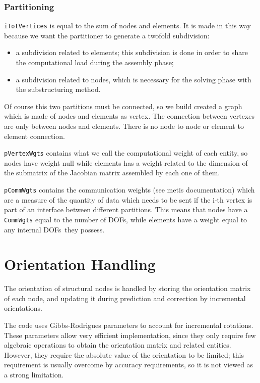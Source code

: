 \documentclass[10pt,fleqn,subeqn]{report}
\newcommand{\dofs}{DOFs}
\begin{document}
\subsection{Partitioning}
\texttt{iTotVertices} is equal to the sum of nodes and elements. 
It is made in this way because we want the partitioner 
to generate a twofold subdivision:
\begin{itemize}
\item a subdivision related to elements; 
this subdivision is done in order to share the computational 
load during the assembly phase;
\item a subdivision related to nodes, 
which is necessary for the solving phase with the substructuring method.
\end{itemize}
Of course this two partitions must be connected, 
so we build created a graph which is made of nodes and elements as vertex. 
The connection between vertexes are only between nodes and elements. 
There is no node to node or element to element connection.

\texttt{pVertexWgts} 
contains what we call the computational weight of each entity, 
so nodes have weight null while elements has a weight related to 
the dimension of the submatrix of the Jacobian matrix assembled
by each one of them.

\texttt{pCommWgts} contains the communication weights 
(see metis documentation) which are a measure of the quantity 
of data which needs to be sent if the i-th vertex is part 
of an interface between different partitions. 
This means that nodes have a \texttt{CommWgts} equal to the number 
of \dofs, while elements have a weight equal
to any internal \dofs\ they possess.


\chapter{Orientation Handling}
The orientation of structural nodes is handled by storing the orientation
matrix of each node, and updating it during prediction and correction 
by incremental orientations.

The code uses Gibbs-Rodrigues parameters to account for incremental 
rotations.
These parameters allow very efficient implementation, since they
only require few algebraic operations to obtain the orientation matrix
and related entities.
However, they require the absolute value of the orientation to be limited;
this requirement is usually overcome by accuracy requirements,
so it is not viewed as a strong limitation.
\end{document}
